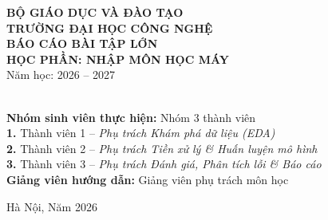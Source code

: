 \documentclass[12pt,a4paper]{report}
\begin{document}
\begin{titlepage}
    \centering
    \vspace*{1cm}
    {\Large\bfseries BỘ GIÁO DỤC VÀ ĐÀO TẠO}\\[0.5cm]
    {\large\bfseries TRƯỜNG ĐẠI HỌC CÔNG NGHỆ}\\[2cm]
    
    {\Huge\bfseries BÁO CÁO BÀI TẬP LỚN}\\[0.5cm]
    {\Large\bfseries HỌC PHẦN: NHẬP MÔN HỌC MÁY}\\[0.3cm]
    {\large Năm học: 2026 -- 2027}\\[2cm]
    
    \\[2.5cm]
    
    \begin{flushleft}
        \large
        \textbf{Nhóm sinh viên thực hiện:} Nhóm 3 thành viên\\
        \textbf{1.} Thành viên 1 -- \textit{Phụ trách Khám phá dữ liệu (EDA)}\\
        \textbf{2.} Thành viên 2 -- \textit{Phụ trách Tiền xử lý \& Huấn luyện mô hình}\\
        \textbf{3.} Thành viên 3 -- \textit{Phụ trách Đánh giá, Phân tích lỗi \& Báo cáo}\\[0.8cm]
        \textbf{Giảng viên hướng dẫn:} Giảng viên phụ trách môn học
    \end{flushleft}
    
    \vfill
    {\large Hà Nội, Năm 2026}
\end{titlepage}

\tableofcontents
\newpage
\listoffigures
\newpage
\listoftables
\newpage










\newpage


\end{document}
